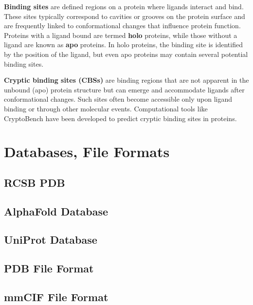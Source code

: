 \textbf{Binding sites} are defined regions on a protein where ligands interact and bind. These sites typically correspond to cavities or grooves on the protein surface and are frequently linked to conformational changes that influence protein function. Proteins with a ligand bound are termed \textbf{holo} proteins, while those without a ligand are known as \textbf{apo} proteins. In holo proteins, the binding site is identified by the position of the ligand, but even apo proteins may contain several potential binding sites.

\textbf{Cryptic binding sites (CBSs)} are binding regions that are not apparent in the unbound (apo) protein structure but can emerge and accommodate ligands after conformational changes. Such sites often become accessible only upon ligand binding or through other molecular events. Computational tools like CryptoBench have been developed to predict cryptic binding sites in proteins.


\section{Databases, File Formats}
\label{sec:dbs-formats}

\subsection{RCSB PDB}
\label{sec:rcsb-pdb}

\subsection{AlphaFold Database}
\label{sec:alphafold-db}

\subsection{UniProt Database}
\label{sec:uniprot-db}

\subsection{PDB File Format}
\label{sec:pdb-format}

\subsection{mmCIF File Format}
\label{sec:mmcif-format}

